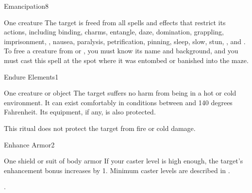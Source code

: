 \begin{spellsection}{Emancipation}{8}
\begin{spelltarget}{One creature}
    \spelleffect The target is freed from all spells and effects that restrict its actions, including binding, charms, entangle, daze, domination, grappling, imprisonment, , nausea, paralysis, petrification, pinning, sleep, slow, stun, , and . To free a creature from  or , you must know its name and background, and you must cast this spell at the spot where it was entombed or banished into the maze.
\end{spelltarget}
\end{spellsection}

\begin{spellsection}{Endure Elements}{1}
\spelldur \durext
\begin{spelltarget}{One creature or object}
    \spelleffect The target suffers no harm from being in a hot or cold environment. It can exist comfortably in conditions between  and 140 degrees Fahrenheit. Its equipment, if any, is also protected.
\end{spelltarget}
\spellnotes This ritual does not protect the target from fire or cold damage.
\end{spellsection}

\begin{spellsection}{Enhance Armor}{2}
\begin{spelltarget}{One shield or suit of body armor}
    \spelleffect If your caster level is high enough, the target's enhancement bonus increases by 1. Minimum caster levels are described in .
\end{spelltarget}
.
\end{spellsection}

